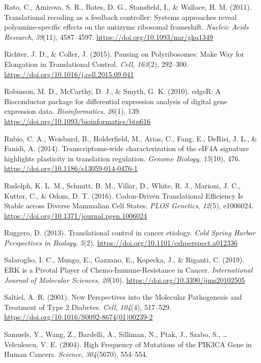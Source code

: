 \documentclass[12pt,openany]{book}
\begin{document}
\hypertarget{ref-Rato2011}{}
Rato, C., Amirova, S. R., Bates, D. G., Stansfield, I., \& Wallace, H.
M. (2011). Translational recoding as a feedback controller: Systems
approaches reveal polyamine-specific effects on the antizyme ribosomal
frameshift. \emph{Nucleic Acids Research}, \emph{39}(11), 4587--4597.
\url{https://doi.org/10.1093/nar/gkq1349}

\hypertarget{ref-Richter2015}{}
Richter, J. D., \& Coller, J. (2015). Pausing on Polyribosomes: Make Way
for Elongation in Translational Control. \emph{Cell}, \emph{163}(2),
292--300. \url{https://doi.org/10.1016/j.cell.2015.09.041}

\hypertarget{ref-Robinson2010}{}
Robinson, M. D., McCarthy, D. J., \& Smyth, G. K. (2010). edgeR: A
Bioconductor package for differential expression analysis of digital
gene expression data. \emph{Bioinformatics}, \emph{26}(1), 139.
\url{https://doi.org/10.1093/bioinformatics/btp616}

\hypertarget{ref-Rubio2014}{}
Rubio, C. A., Weisburd, B., Holderfield, M., Arias, C., Fang, E.,
DeRisi, J. L., \& Fanidi, A. (2014). Transcriptome-wide characterization
of the eIF4A signature highlights plasticity in translation regulation.
\emph{Genome Biology}, \emph{15}(10), 476.
\url{https://doi.org/10.1186/s13059-014-0476-1}

\hypertarget{ref-Rudolph2016}{}
Rudolph, K. L. M., Schmitt, B. M., Villar, D., White, R. J., Marioni, J.
C., Kutter, C., \& Odom, D. T. (2016). Codon-Driven Translational
Efficiency Is Stable across Diverse Mammalian Cell States. \emph{PLOS
Genetics}, \emph{12}(5), e1006024.
\url{https://doi.org/10.1371/journal.pgen.1006024}

\hypertarget{ref-Ruggero2013}{}
Ruggero, D. (2013). Translational control in cancer etiology. \emph{Cold
Spring Harbor Perspectives in Biology}, \emph{5}(2).
\url{https://doi.org/10.1101/cshperspect.a012336}

\hypertarget{ref-Salaroglio2019}{}
Salaroglio, I. C., Mungo, E., Gazzano, E., Kopecka, J., \& Riganti, C.
(2019). ERK is a Pivotal Player of Chemo-Immune-Resistance in Cancer.
\emph{International Journal of Molecular Sciences}, \emph{20}(10).
\url{https://doi.org/10.3390/ijms20102505}

\hypertarget{ref-Saltiel2001}{}
Saltiel, A. R. (2001). New Perspectives into the Molecular Pathogenesis
and Treatment of Type 2 Diabetes. \emph{Cell}, \emph{104}(4), 517--529.
\url{https://doi.org/10.1016/S0092-8674(01)00239-2}

\hypertarget{ref-Samuels2004}{}
Samuels, Y., Wang, Z., Bardelli, A., Silliman, N., Ptak, J., Szabo, S.,
\ldots{} Velculescu, V. E. (2004). High Frequency of Mutations of the
PIK3CA Gene in Human Cancers. \emph{Science}, \emph{304}(5670),
554--554.
\end{document}
